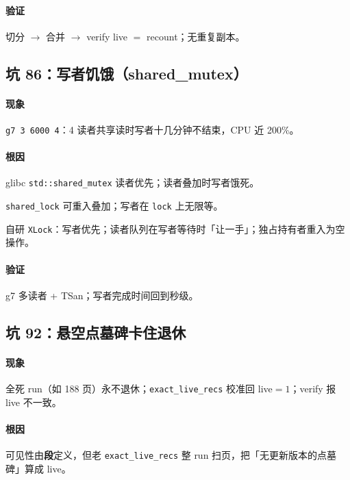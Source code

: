 \paragraph{验证}
切分 $\to$ 合并 $\to$ verify live $=$ recount；无重复副本。

\subsection{坑 86：写者饥饿（shared\_mutex）}
\paragraph{现象}
\texttt{g7 3 6000 4}：4 读者共享读时写者十几分钟不结束，CPU 近 200\%。

\paragraph{根因}
glibc \texttt{std::shared\_mutex} 读者优先；读者叠加时写者饿死。

\begin{fixold}
\texttt{shared\_lock} 可重入叠加；写者在 \texttt{lock} 上无限等。
\end{fixold}

\begin{fixnew}
自研 \texttt{XLock}：写者优先；读者队列在写者等待时「让一手」；独占持有者重入为空操作。
\end{fixnew}

\paragraph{验证}
g7 多读者 + TSan；写者完成时间回到秒级。

\subsection{坑 92：悬空点墓碑卡住退休}
\paragraph{现象}
全死 run（如 188 页）永不退休；\texttt{exact\_live\_recs} 校准回 live$=1$；verify 报 live 不一致。

\paragraph{根因}
可见性由\textbf{段}定义，但老 \texttt{exact\_live\_recs} 整 run 扫页，把「无更新版本的点墓碑」算成 live。

